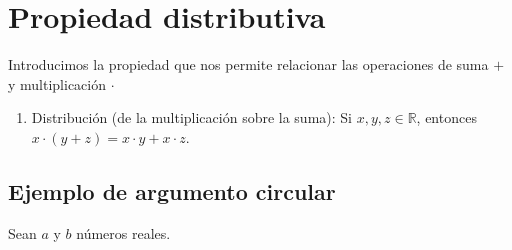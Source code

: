 \documentclass[11pt]{article}
\newcommand{\R}{\mathbb{R}}
\begin{document}
\section*{Propiedad distributiva}

Introducimos la propiedad que nos permite relacionar las operaciones de suma $+$ y multiplicación $\cdot$

\begin{enumerate}[start=11]%
    \item Distribución (de la multiplicación sobre la suma): Si $x,y,z\in \R$, entonces $x\cdot (y+z)=x\cdot y+ x\cdot z$.
\end{enumerate}

\subsection*{Ejemplo de argumento circular}
%
%
Sean $a$ y $b$ números reales.
\end{document}
